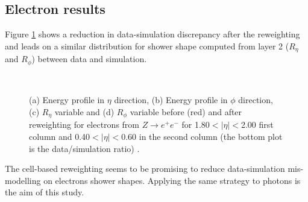 \subsection{Electron results}
Figure \ref{fig:gamma:ss:reweighting:electron} shows a reduction in data-simulation discrepancy after the reweighting and leads on a similar distribution for shower shape computed from layer 2 ($R_{\eta}$ and $R_{\phi}$) between data and simulation.
\begin{figure}[htbp]
    \centering
     \\
    \caption{(a) Energy profile in $\eta$ direction, (b) Energy profile in $\phi$ direction, (c) $R_{\eta}$ variable and (d) $R_{\phi}$ variable before (red) and after reweighting for electrons from $Z\rightarrow e^+e^-$ for 1.80$<|\eta|<$2.00 first column and 0.40$<|\eta|<$0.60 in the second column (the bottom plot is the data/simulation ratio) \cite{khandoga}.}
    \label{fig:gamma:ss:reweighting:electron}
\end{figure}
The cell-based reweighting seems to be promising to reduce data-simulation mis-modelling on electrons shower shapes. Applying the same strategy to photons is the aim of this study. 

